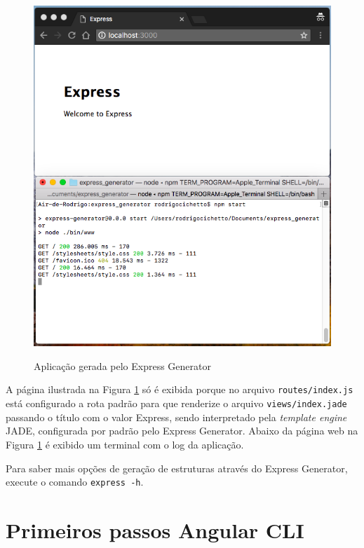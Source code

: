 \documentclass[
	12pt,				%
	openright,			%
	twoside,			%
	a4paper,			%
	english,			%
	brazil				%
	]{abntex2}
\begin{document}
\begin{anexosenv}
\begin{figure}[h]
	\centering

	\caption{Aplicação gerada pelo Express Generator} \label{fig:ExpressGeneratorApp}
    \includegraphics[scale=0.5]{express-generator-app} \\

\end{figure}

A página ilustrada na Figura \ref{fig:ExpressGeneratorApp} só é exibida porque no arquivo \verb|routes/index.js| está configurado a rota padrão para que renderize o arquivo \verb|views/index.jade| passando o título com o valor Express, sendo interpretado pela \textit{template engine} JADE, configurada por padrão pelo Express Generator. Abaixo da página web na Figura \ref{fig:ExpressGeneratorApp} é exibido um terminal com o log da aplicação.

Para saber mais opções de geração de estruturas através do Express Generator, execute o comando \verb|express -h|.

\chapter{Primeiros passos Angular CLI} 


\end{anexosenv}
\end{document}
